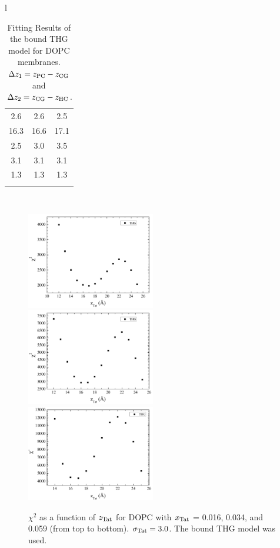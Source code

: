\begin{table}[htbp]
\begin{tabular}{l}
\begin{tabular}{c c c}
    2.6 & 2.6 & 2.5 \\
    16.3 & 16.6 & 17.1 \\
    2.5 & 3.0 & 3.5 \\ 
    3.1 & 3.1 & 3.1 \\
    1.3 & 1.3 & 1.3 \\
    & &
  \end{tabular}
\\
\hline\hline
\end{tabular}
  \caption{Fitting Results of the bound THG model for DOPC membranes. 
  $\Delta z_1 = z_\textrm{PC}-z_\textrm{CG}$ and $\Delta z_2 = z_\textrm{CG}-z_\textrm{HC}$.}
  \label{tb:bound_DOPC}
\end{table}

\begin{figure}[htbp]
  \centering
  \includegraphics[width=0.5\textwidth]{figures/Tat/SDP_Results/X2/DOPC_Tat_62to1_3p0_bound_X2}
  \includegraphics[width=0.5\textwidth]{figures/Tat/SDP_Results/X2/DOPC_Tat_28to1_3p0_bound_X2}
  \includegraphics[width=0.5\textwidth]{figures/Tat/SDP_Results/X2/DOPC_Tat_16to1_3p0_bound_X2}
  \caption{$\chi^2$ as a function of $z_\textrm{Tat}$ for DOPC
  with $x_\textrm{Tat}$ = 0.016, 0.034, and 0.059 (from top to bottom). 
  $\sigma_\textrm{Tat} = 3.0$. The bound THG model was used.}
  \label{fig:bound_DOPC_X2}
\end{figure}

